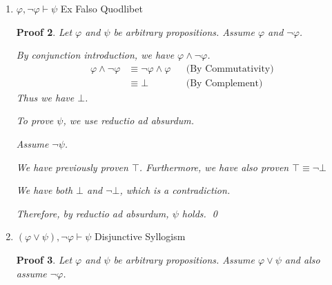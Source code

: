 \documentclass[12pt]{article}
\theoremstyle{proofstyle}
\newtheorem*{proof*}{Proof}
\let\oldquote\quote
\let\oldendquote\endquote
\renewenvironment{quote}
    {\oldquote\setlength{\parskip}{0.2em}}
    {\oldendquote}
\begin{document}
\begin{enumerate}[left=0pt, itemsep=2em, parsep=1em]
\begin{enumerate}[label=(\alph*), itemsep=1.5em, leftmargin=2em]
\begin{proof*}
\begin{quote}
    Thus we have both $(\varphi \vee \psi)$ and $\neg(\varphi \vee \psi)$, which is a contradiction.

    \end{quote}
    
    Therefore, by reductio ad absurdum, $\xi$ holds. \qed
\end{proof*}

\item $\varphi, \neg\varphi \vdash \psi$ \hfill Ex Falso Quodlibet

\begin{proof*}
    Let $\varphi$ and $\psi$ be arbitrary propositions. Assume $\varphi$ and $\neg\varphi$.
    
    By conjunction introduction, we have $\varphi \wedge \neg\varphi$.
    \begin{align*}
        \varphi \wedge \neg\varphi &\equiv \neg\varphi \wedge \varphi && \text{(By Commutativity)} \\
        &\equiv \bot && \text{(By Complement)}
    \end{align*}
    Thus we have $\bot$.
    
    To prove $\psi$, we use reductio ad absurdum.

    \begin{quote}
    Assume $\neg\psi$.
    
    We have previously proven $\top$. Furthermore, we have also proven $\top \equiv \neg\bot$
    
    We have both $\bot$ and $\neg\bot$, which is a contradiction.
    \end{quote}
    
    Therefore, by reductio ad absurdum, $\psi$ holds. \qed
\end{proof*}
\newpage
\item $(\varphi \vee \psi), \neg\varphi \vdash \psi$ \hfill Disjunctive Syllogism

\begin{proof*}
    Let $\varphi$ and $\psi$ be arbitrary propositions. Assume $\varphi \lor \psi$ and also assume $\neg\varphi$.
    

\end{proof*}
\end{enumerate}
\end{enumerate}
\end{document}
